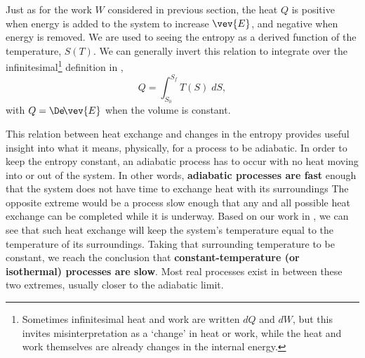 Just as for the work $W$ considered in previous section, the heat $Q$ is positive when energy is added to the system to increase $\vev{E}$, and negative when energy is removed.
We are used to seeing the entropy as a derived function of the temperature, $S(T)$.
We can generally invert this relation to integrate over the infinitesimal\footnote{Sometimes infinitesimal heat and work are written $dQ$ and $dW$, but this invites misinterpretation as a `change' in heat or work, while the heat and work themselves are already changes in the internal energy.} definition in ,
\begin{equation}
  \label{eq:heat}
  Q = \int_{S_0}^{S_f} T(S) \; dS,
\end{equation}
with $Q = \De\!\vev{E}$ when the volume is constant.

This relation between heat exchange and changes in the entropy provides useful insight into what it means, physically, for a process to be adiabatic.
In order to keep the entropy constant, an adiabatic process has to occur with no heat moving into or out of the system.
In other words, \textbf{adiabatic processes are fast} enough that the system does not have time to exchange heat with its surroundings 
The opposite extreme would be a process slow enough that any and all possible heat exchange can be completed while it is underway.
Based on our work in , we can see that such heat exchange will keep the system's temperature equal to the temperature of its surroundings.
Taking that surrounding temperature to be constant, we reach the conclusion that \textbf{constant-temperature (or isothermal) processes are slow}.
Most real processes exist in between these two extremes, usually closer to the adiabatic limit.



